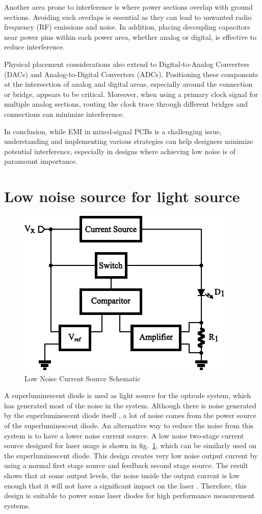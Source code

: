 Another area prone to interference is where power sections overlap with ground sections. Avoiding such overlaps is essential as they can lead to unwanted radio frequency (RF) emissions and noise. In addition, placing decoupling capacitors near power pins within each power area, whether analog or digital, is effective to reduce interference.

Physical placement considerations also extend to Digital-to-Analog Converters (DACs) and Analog-to-Digital Converters (ADCs). Positioning these components at the intersection of analog and digital areas, especially around the connection or bridge, appears to be critical. Moreover, when using a primary clock signal for multiple analog sections, routing the clock trace through different bridges and connections can minimize interference.

In conclusion, while EMI in mixed-signal PCBs is a challenging issue, understanding and implementing various strategies can help designers minimize potential interference, especially in designs where achieving low noise is of paramount importance.


\section{Low noise source for light source}

\begin{figure}[H]
\centerline{\includegraphics[width=0.6\linewidth]{3-literature/LowNoiseCurrentSourceSch.pdf}}
\caption{Low Noise Current Source Schematic}
\label{fig_LowNoiseCurrentSourceSch}
\end{figure}

A superluminescent diode is used as light source for the optrode system, which has generated most of the noise in the system.  Although there is noise generated by the superluminescent diode itself \cite{SLDNoise}, a lot of noise comes from the power source of the superluminescent diode.  An alternative way to reduce the noise from this system is to have a lower noise current source.  A low noise two-stage current source designed for laser usage \cite{LowNoiseCurrentSource} is shown in fig.~\ref{fig_LowNoiseCurrentSourceSch}, which can be similarly used on the superluminescent diode.  This design creates very low noise output current by using a normal first stage source and feedback second stage source.  The result shows that at some output levels, the noise inside the output current is low enough that it will not have a significant impact on the laser \cite{LinewidthQuantumCascadeLaser}.  Therefore, this design is suitable to power some laser diodes for high performance measurement systems.

